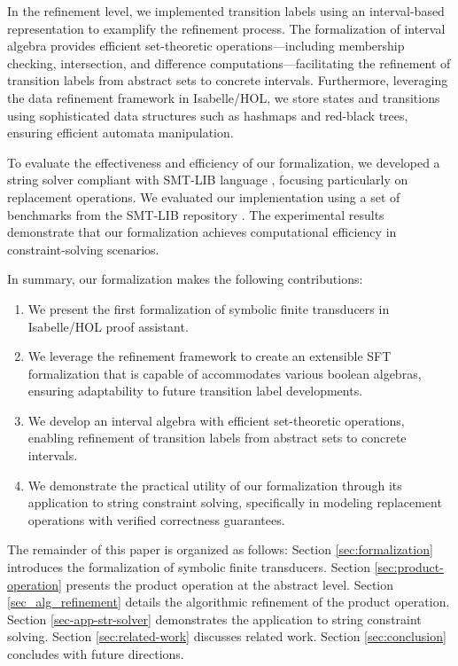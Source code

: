 \documentclass[a4paper,UKenglish,cleveref, autoref, thm-restate]{lipics-v2021}
\begin{document}
In the refinement level, we implemented transition labels using an interval-based representation to examplify the refinement process. The formalization of interval algebra provides efficient set-theoretic operations—including membership checking, intersection, and difference computations—facilitating the refinement of transition labels from abstract sets to concrete intervals. Furthermore, leveraging the data refinement framework \cite{DBLP:conf/itp/Lammich13} in Isabelle/HOL, we store states and transitions using sophisticated data structures such as hashmaps and red-black trees, ensuring efficient automata manipulation.

To evaluate the effectiveness and efficiency of our formalization, we developed a string solver compliant with SMT-LIB language \cite{smtlib}, focusing particularly on replacement operations. We evaluated our implementation using a set of benchmarks from the SMT-LIB repository \cite{smtlib_benchmarks}. The experimental results demonstrate that our formalization achieves computational efficiency in constraint-solving scenarios.



In summary, our formalization makes the following contributions:
\begin{enumerate}
\item We present the first formalization of symbolic finite transducers in Isabelle/HOL proof assistant.
\item We leverage the refinement framework to create an extensible SFT formalization that is capable of accommodates various boolean algebras, ensuring adaptability to future transition label developments.
\item We develop an interval algebra with efficient set-theoretic operations, enabling refinement of transition labels from abstract sets to concrete intervals.
\item We demonstrate the practical utility of our formalization through its application to string constraint solving, specifically in modeling replacement operations with verified correctness guarantees.
\end{enumerate}

The remainder of this paper is organized as follows:
Section \ref{sec:formalization} introduces the formalization of symbolic finite transducers.
Section \ref{sec:product-operation} presents the product operation at the abstract level.
Section \ref{sec_alg_refinement} details the algorithmic refinement of the product operation.
Section \ref{sec-app-str-solver} demonstrates the application to string constraint solving.
Section \ref{sec:related-work} discusses related work.
Section \ref{sec:conclusion} concludes with future directions. 
\end{document}
